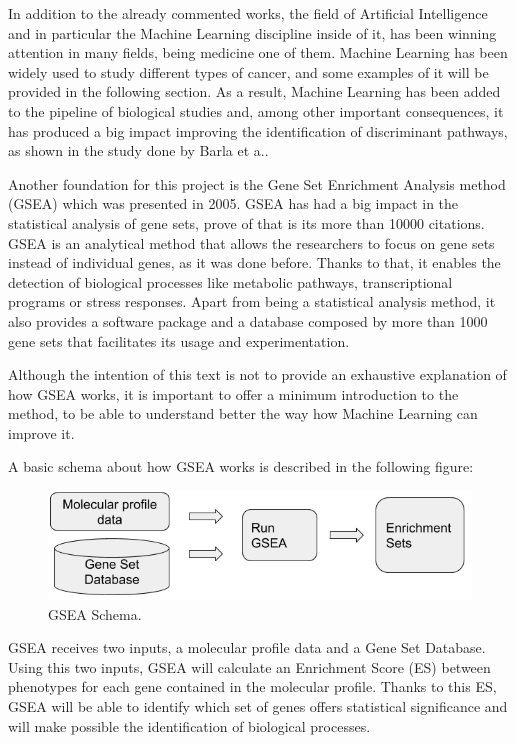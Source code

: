 In addition to the already commented works, the field of Artificial Intelligence and in particular the Machine Learning discipline inside of it, has been winning attention in many fields, being medicine one of them.
Machine Learning has been widely used to study different types of cancer, and some examples of it will be provided in the following section.
As a result, Machine Learning has been added to the pipeline of biological studies and, among other important consequences, it has produced a big impact improving the identification of discriminant pathways, as shown in the study done by Barla et a.\cite{Barla2014}.

Another foundation for this project is the Gene Set Enrichment Analysis method (GSEA) \cite{Subramanian15545} which was presented in 2005.
GSEA has had a big impact in the statistical analysis of gene sets, prove of that is its more than 10000 citations.
GSEA is an analytical method that allows the researchers to focus on gene sets instead of individual genes, as it was done before.
Thanks to that, it enables the detection of biological processes like metabolic pathways, transcriptional programs or stress responses. 
Apart from being a statistical analysis method, it also provides a software package and a database composed by more than 1000 gene sets that facilitates its usage and experimentation.

Although the intention of this text is not to provide an exhaustive explanation of how GSEA works, it is important to offer a minimum introduction to the method, to be able to understand better the way how Machine Learning can improve it.

A basic schema about how GSEA works is described in the following figure:

\begin{figure}[h]
    \centering
    \includegraphics[scale=0.5]{../figs/GSEA_schema.png}
    \caption{GSEA Schema.}
    \label{fig:gsea-sch}
\end{figure}

GSEA receives two inputs, a molecular profile data and a Gene Set Database. Using this two inputs, GSEA will calculate an Enrichment Score (ES) between phenotypes for each gene contained in the molecular profile.
Thanks to this ES, GSEA will be able to identify which set of genes offers statistical significance and will make possible the identification of biological processes.

